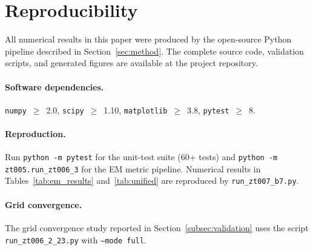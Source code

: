 \documentclass[11pt,a4paper,twocolumn]{article}
\begin{document}




\appendix
\section{Reproducibility}
\label{app:repro}

All numerical results in this paper were produced by the open-source
Python pipeline described in Section~\ref{sec:method}. The complete
source code, validation scripts, and generated figures are available
at the project repository.

\paragraph{Software dependencies.}
\texttt{numpy}~$\geq$~2.0, \texttt{scipy}~$\geq$~1.10,
\texttt{matplotlib}~$\geq$~3.8, \texttt{pytest}~$\geq$~8.

\paragraph{Reproduction.}
Run \texttt{python -m pytest} for the unit-test suite (60+ tests)
and \texttt{python -m zt005.run\_zt006\_3} for the EM metric
pipeline. Numerical results in Tables~\ref{tab:em_results}
and~\ref{tab:unified} are reproduced by
\texttt{run\_zt007\_b7.py}.

\paragraph{Grid convergence.}
The grid convergence study reported in Section~\ref{subsec:validation}
uses the script \texttt{run\_zt006\_2\_23.py} with \texttt{--mode full}.
\end{document}
